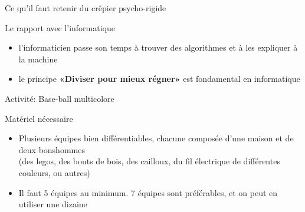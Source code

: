 \documentclass[final,hyperref={pdfpagelabels=false}]{beamer}
\renewenvironment{Coupe}{   }{   }
\begin{document}
\begin{Coupe}
\begin{frame}{Ce qu'il faut retenir du  crêpier psycho-rigide}
  \begin{block}{Le rapport avec l'informatique}
    \begin{itemize}
    \item l'informaticien passe son temps à trouver des algorithmes et  à les
    expliquer à la machine
    \item le principe \alert{\textbf{«Diviser pour mieux régner»}} est
    fondamental en informatique
    \end{itemize}
  \end{block}
\end{frame}



\begin{frame}{Activité: Base-ball multicolore}
  \begin{block}{Matériel nécessaire}
    \begin{itemize}
    \item Plusieurs équipes bien différentiables, chacune composée d'une maison
      et de deux bonshommes\\
      (des legos, des bouts de bois, des cailloux, du fil électrique de
      différentes couleurs, ou autres)

    \item Il faut 5 équipes au minimum. 7 équipes sont préférables, et on peut
      en utiliser une dizaine
    \end{itemize}
  \end{block}


\end{frame}
\end{Coupe}
\end{document}

